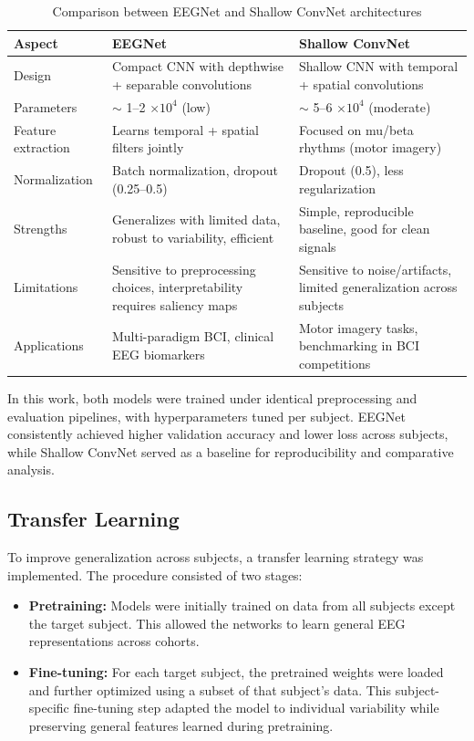 \documentclass[12pt,a4paper]{article}
\begin{document}
\begin{table}[H]
\centering
\caption{Comparison between EEGNet and Shallow ConvNet architectures}
\label{tab:models_comparison}
\begin{tabular}{@{}p{3cm}p{5cm}p{5cm}@{}}
\toprule
\textbf{Aspect} & \textbf{EEGNet} & \textbf{Shallow ConvNet} \\ \midrule
Design & Compact CNN with depthwise + separable convolutions & Shallow CNN with temporal + spatial convolutions \\
Parameters & $\sim$ 1--2 $\times 10^4$ (low) & $\sim$ 5--6 $\times 10^4$ (moderate) \\
Feature extraction & Learns temporal + spatial filters jointly & Focused on mu/beta rhythms (motor imagery) \\
Normalization & Batch normalization, dropout (0.25–0.5) & Dropout (0.5), less regularization \\
Strengths & Generalizes with limited data, robust to variability, efficient & Simple, reproducible baseline, good for clean signals \\
Limitations & Sensitive to preprocessing choices, interpretability requires saliency maps & Sensitive to noise/artifacts, limited generalization across subjects \\
Applications & Multi-paradigm BCI, clinical EEG biomarkers & Motor imagery tasks, benchmarking in BCI competitions \\ \bottomrule
\end{tabular}
\end{table}

In this work, both models were trained under identical preprocessing and evaluation pipelines, with hyperparameters tuned per subject. EEGNet consistently achieved higher validation accuracy and lower loss across subjects, while Shallow ConvNet served as a baseline for reproducibility and comparative analysis.
  
\subsection{Transfer Learning}

To improve generalization across subjects, a transfer learning strategy was implemented. 
The procedure consisted of two stages:

\begin{itemize}
    \item \textbf{Pretraining:} Models were initially trained on data from all subjects except the target subject. This allowed the networks to learn general EEG representations across cohorts.
    \item \textbf{Fine-tuning:} For each target subject, the pretrained weights were loaded and further optimized using a subset of that subject’s data. This subject-specific fine-tuning step adapted the model to individual variability while preserving general features learned during pretraining.
\end{itemize}
\end{document}
